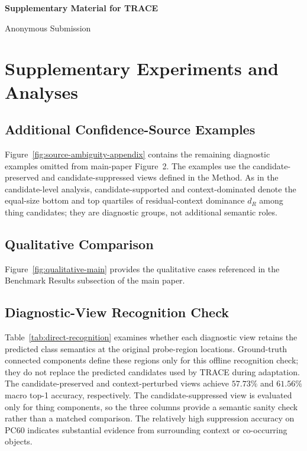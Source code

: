 \documentclass[letterpaper]{article}
\newcommand{\method}{TRACE\xspace}
\begin{document}
\begin{center}
    {\LARGE\bfseries Supplementary Material for \method\par}
    \vspace{0.4em}
    {\normalsize Anonymous Submission\par}
\end{center}
\vspace{0.8em}

\setcounter{secnumdepth}{2}
\appendix
\setcounter{figure}{0}
\renewcommand{\thefigure}{A\arabic{figure}}
\setcounter{table}{0}
\renewcommand{\thetable}{A\arabic{table}}

\section{Supplementary Experiments and Analyses}

\subsection{Additional Confidence-Source Examples}

Figure~\ref{fig:source-ambiguity-appendix} contains the remaining diagnostic examples omitted from main-paper Figure~2. The examples use the candidate-preserved and candidate-suppressed views defined in the Method. As in the candidate-level analysis, candidate-supported and context-dominated denote the equal-size bottom and top quartiles of residual-context dominance $d_R$ among thing candidates; they are diagnostic groups, not additional semantic roles.

\subsection{Qualitative Comparison}

Figure~\ref{fig:qualitative-main} provides the qualitative cases referenced in the Benchmark Results subsection of the main paper.

\subsection{Diagnostic-View Recognition Check}

Table~\ref{tab:direct-recognition} examines whether each diagnostic view retains the predicted class semantics at the original probe-region locations. Ground-truth connected components define these regions only for this offline recognition check; they do not replace the predicted candidates used by \method during adaptation. The candidate-preserved and context-perturbed views achieve $57.73\%$ and $61.56\%$ macro top-1 accuracy, respectively. The candidate-suppressed view is evaluated only for thing components, so the three columns provide a semantic sanity check rather than a matched comparison. The relatively high suppression accuracy on PC60 indicates substantial evidence from surrounding context or co-occurring objects.
\end{document}
